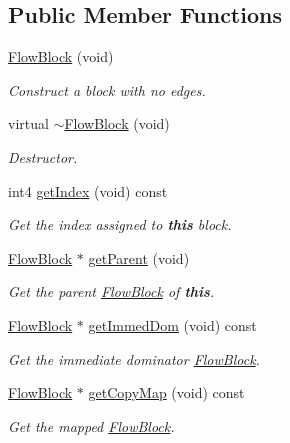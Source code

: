 \subsection*{Public Member Functions}
\begin{DoxyCompactItemize}
\item 
\mbox{\hyperlink{class_flow_block_a1322971561fc70b9f0a9a9a7e05b6c7c}{Flow\+Block}} (void)
\begin{DoxyCompactList}\small\item\em Construct a block with no edges. \end{DoxyCompactList}\item 
virtual \mbox{\hyperlink{class_flow_block_a98eda86da929807f1e46575375cffd46}{$\sim$\+Flow\+Block}} (void)
\begin{DoxyCompactList}\small\item\em Destructor. \end{DoxyCompactList}\item 
int4 \mbox{\hyperlink{class_flow_block_a1830ec9a8397398dd1633cdd8ca56152}{get\+Index}} (void) const
\begin{DoxyCompactList}\small\item\em Get the index assigned to {\bfseries{this}} block. \end{DoxyCompactList}\item 
\mbox{\hyperlink{class_flow_block}{Flow\+Block}} $\ast$ \mbox{\hyperlink{class_flow_block_aa09d7d958c190fa86a30dbe9ac23c78f}{get\+Parent}} (void)
\begin{DoxyCompactList}\small\item\em Get the parent \mbox{\hyperlink{class_flow_block}{Flow\+Block}} of {\bfseries{this}}. \end{DoxyCompactList}\item 
\mbox{\hyperlink{class_flow_block}{Flow\+Block}} $\ast$ \mbox{\hyperlink{class_flow_block_a4b223b939cafc0405323dd0d6dc749d6}{get\+Immed\+Dom}} (void) const
\begin{DoxyCompactList}\small\item\em Get the immediate dominator \mbox{\hyperlink{class_flow_block}{Flow\+Block}}. \end{DoxyCompactList}\item 
\mbox{\hyperlink{class_flow_block}{Flow\+Block}} $\ast$ \mbox{\hyperlink{class_flow_block_a40e35da1a06856a7f9a8af381c3e3261}{get\+Copy\+Map}} (void) const
\begin{DoxyCompactList}\small\item\em Get the mapped \mbox{\hyperlink{class_flow_block}{Flow\+Block}}. \end{DoxyCompactList}\item 

\end{DoxyCompactItemize}
